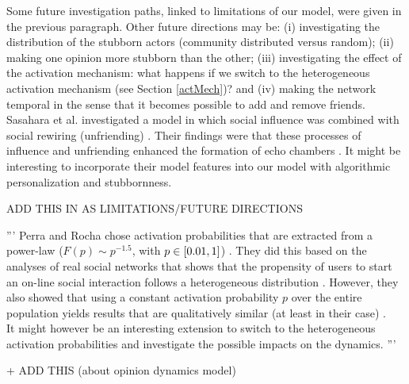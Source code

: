\documentclass[11 pt , letterpaper , twoside , openright]{book}
\begin{document}
Some future investigation paths, linked to limitations of our model, were given in the previous paragraph. Other future directions may be: (i) investigating the distribution of the stubborn actors (community distributed versus random); (ii) making one opinion more stubborn than the other; (iii) investigating the effect of the activation mechanism: what happens if we switch to the heterogeneous activation mechanism (see Section \ref{actMech})? and (iv) making the network temporal in the sense that it becomes possible to add and remove friends. Sasahara et al. investigated a model in which social influence was combined with social rewiring (unfriending) \cite{Sasahara2020}. Their findings were that these processes of influence and unfriending enhanced the formation of echo chambers \cite{Sasahara2020}. It might be interesting to incorporate their model features into our model with algorithmic personalization and stubbornness. 

ADD THIS IN AS LIMITATIONS/FUTURE DIRECTIONS
 
''' Perra and Rocha chose activation probabilities that are extracted from a power-law ($F(p) \sim p^{-1.5}$, with $p \in \interval{0.01}{1}$) \cite{Perra2019}. They did this based on the analyses of real social networks that shows that the propensity of users to start an on-line social interaction follows a heterogeneous distribution \cite{Perra2012}\cite{Perra2019}. However, they also showed that using a constant activation probability $p$ over the entire population yields results that are qualitatively similar (at least in their case) \cite{Perra2019}. \\
\newline
 It might however be an interesting extension to switch to the heterogeneous activation probabilities and investigate the possible impacts on the dynamics. '''
 
+ ADD THIS (about opinion dynamics model)
\end{document}
